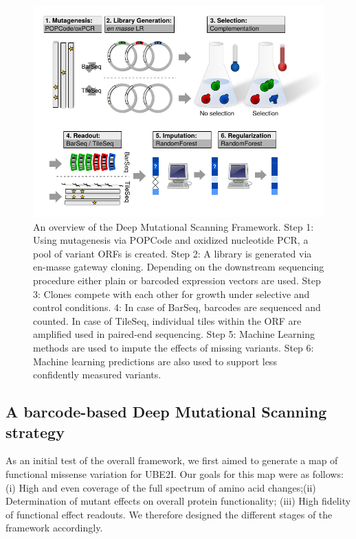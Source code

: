 \begin{figure}[h!]
	\centering
	\includegraphics[width=\textwidth]{img/framework_flowchart.pdf}
	\caption{An overview of the Deep Mutational Scanning Framework. Step 1: Using mutagenesis via POPCode and oxidized nucleotide PCR, a pool of variant ORFs is created. Step 2: A library is generated via en-masse gateway cloning. Depending on the downstream sequencing procedure either plain or barcoded expression vectors are used. Step 3: Clones compete with each other for growth under selective and control conditions. 4: In case of BarSeq, barcodes are sequenced and counted. In case of TileSeq, individual tiles within the ORF are amplified used in paired-end sequencing. Step 5: Machine Learning methods are used to impute the effects of missing variants. Step 6: Machine learning predictions are also used to support less confidently measured variants. }
	\label{fig:framework}
\end{figure}


\subsection{A barcode-based Deep Mutational Scanning strategy}


As an initial test of the overall framework, we first aimed to generate a map of functional missense variation for UBE2I. Our goals for this map were as follows: (i) High and even coverage of the full spectrum of amino acid changes;(ii) Determination of mutant effects on overall protein functionality; (iii) High fidelity of functional effect readouts. We therefore designed the different stages of the framework accordingly. 

